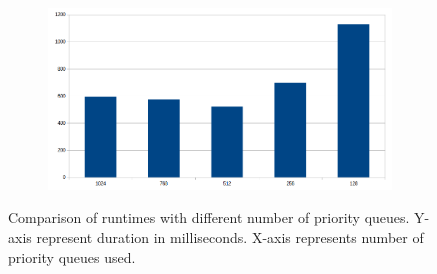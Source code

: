 \documentclass{article}
\begin{document}
\begin{figure}[h]
    \centering
    \begin{subfigure}[b]{1.0\textwidth}
        \centering
        \includegraphics[width=\textwidth]{figures/prio_queue.png}
    \end{subfigure}
    \hfill
    \caption{Comparison of runtimes with different number of priority queues. Y-axis represent duration in milliseconds. X-axis represents number of priority queues used.}
    \label{fig:prio_queue}
\end{figure}
%
\end{document}
